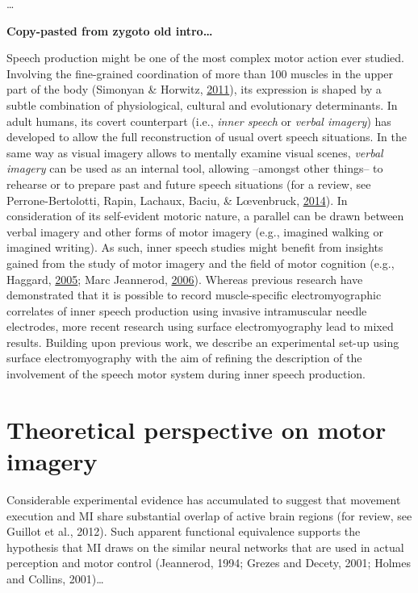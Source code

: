 \documentclass[a4paper,12pt,twoside,openright,oldfontcommands]{memoir}
\begin{document}
\ldots{}

\textbf{Copy-pasted from zygoto old intro\ldots{}}

Speech production might be one of the most complex motor action ever
studied. Involving the fine-grained coordination of more than 100
muscles in the upper part of the body (Simonyan \& Horwitz,
\protect\hyperlink{ref-simonyan_laryngeal_2011}{2011}), its expression
is shaped by a subtle combination of physiological, cultural and
evolutionary determinants. In adult humans, its covert counterpart
(i.e., \emph{inner speech} or \emph{verbal imagery}) has developed to
allow the full reconstruction of usual overt speech situations. In the
same way as visual imagery allows to mentally examine visual scenes,
\emph{verbal imagery} can be used as an internal tool, allowing
--amongst other things-- to rehearse or to prepare past and future
speech situations (for a review, see Perrone-Bertolotti, Rapin, Lachaux,
Baciu, \& Lœvenbruck,
\protect\hyperlink{ref-Perrone-Bertolotti2014}{2014}). In consideration
of its self-evident motoric nature, a parallel can be drawn between
verbal imagery and other forms of motor imagery (e.g., imagined walking
or imagined writing). As such, inner speech studies might benefit from
insights gained from the study of motor imagery and the field of motor
cognition (e.g., Haggard,
\protect\hyperlink{ref-haggard_conscious_2005}{2005}; Marc Jeannerod,
\protect\hyperlink{ref-jeannerod_motor_2006}{2006}). Whereas previous
research have demonstrated that it is possible to record muscle-specific
electromyographic correlates of inner speech production using invasive
intramuscular needle electrodes, more recent research using surface
electromyography lead to mixed results. Building upon previous work, we
describe an experimental set-up using surface electromyography with the
aim of refining the description of the involvement of the speech motor
system during inner speech production.

\section{Theoretical perspective on motor
imagery}\label{theoretical-perspective-on-motor-imagery}

Considerable experimental evidence has accumulated to suggest that
movement execution and MI share substantial overlap of active brain
regions (for review, see Guillot et al., 2012). Such apparent functional
equivalence supports the hypothesis that MI draws on the similar neural
networks that are used in actual perception and motor control
(Jeannerod, 1994; Grezes and Decety, 2001; Holmes and Collins,
2001)\ldots{}
\end{document}
